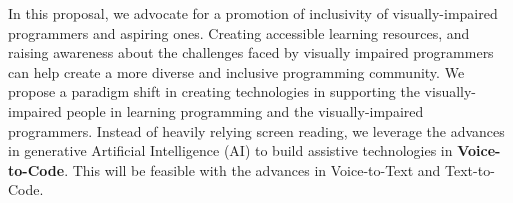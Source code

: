 In this proposal, we advocate for a promotion of inclusivity of
visually-impaired programmers and aspiring ones. Creating accessible
learning resources, and raising awareness about the challenges faced
by visually impaired programmers can help create a more diverse and
inclusive programming community. We propose a paradigm shift in
creating technologies in supporting the visually-impaired people in
learning programming and the visually-impaired programmers. Instead of
heavily relying screen reading, we leverage the advances in generative
Artificial Intelligence (AI) to build assistive technologies in {\bf
Voice-to-Code}. This will be feasible with the advances in
Voice-to-Text and Text-to-Code.




